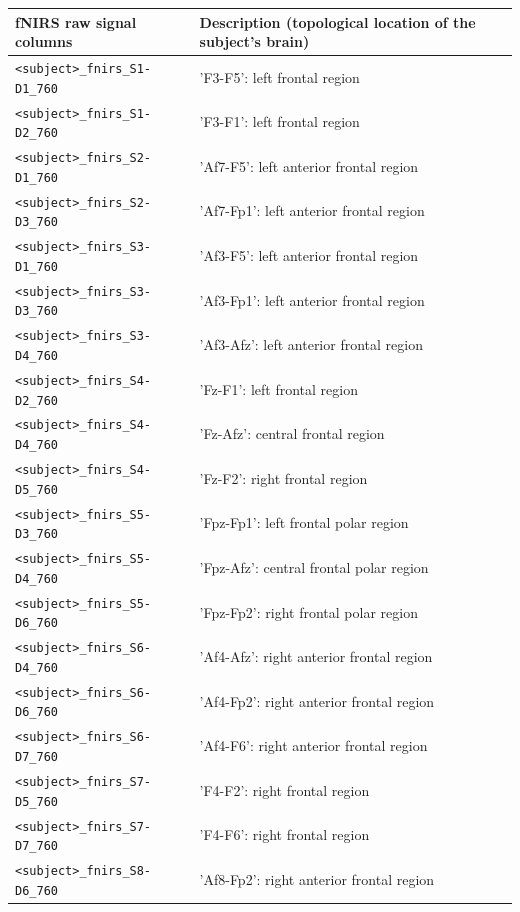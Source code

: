 \begin{table}
  \footnotesize
  \centering
  \begin{tabularx}{\textwidth}{lX}
  \toprule
  fNIRS raw signal columns & Description (topological location of the subject's brain) \\
  \midrule
  \texttt{<subject>\_fnirs\_S1-D1\_760} & 'F3-F5': left frontal region \\
  \texttt{<subject>\_fnirs\_S1-D2\_760} & 'F3-F1': left frontal region  \\
  \texttt{<subject>\_fnirs\_S2-D1\_760} & 'Af7-F5': left anterior frontal region  \\
  \texttt{<subject>\_fnirs\_S2-D3\_760} & 'Af7-Fp1': left anterior frontal region  \\
  \texttt{<subject>\_fnirs\_S3-D1\_760} & 'Af3-F5': left anterior frontal region  \\
  \texttt{<subject>\_fnirs\_S3-D3\_760} & 'Af3-Fp1': left anterior frontal region  \\
  \texttt{<subject>\_fnirs\_S3-D4\_760} & 'Af3-Afz': left anterior frontal region  \\
  \texttt{<subject>\_fnirs\_S4-D2\_760} & 'Fz-F1': left frontal region  \\
  \texttt{<subject>\_fnirs\_S4-D4\_760} & 'Fz-Afz': central frontal region  \\
  \texttt{<subject>\_fnirs\_S4-D5\_760} & 'Fz-F2': right frontal region  \\
  \texttt{<subject>\_fnirs\_S5-D3\_760} & 'Fpz-Fp1': left frontal polar region  \\
  \texttt{<subject>\_fnirs\_S5-D4\_760} & 'Fpz-Afz': central frontal polar region  \\
  \texttt{<subject>\_fnirs\_S5-D6\_760} & 'Fpz-Fp2': right frontal polar region  \\
  \texttt{<subject>\_fnirs\_S6-D4\_760} & 'Af4-Afz': right anterior frontal region  \\
  \texttt{<subject>\_fnirs\_S6-D6\_760} & 'Af4-Fp2': right anterior frontal region  \\
  \texttt{<subject>\_fnirs\_S6-D7\_760} & 'Af4-F6': right anterior frontal region  \\
  \texttt{<subject>\_fnirs\_S7-D5\_760} & 'F4-F2': right frontal region  \\
  \texttt{<subject>\_fnirs\_S7-D7\_760} & 'F4-F6': right frontal region  \\
  \texttt{<subject>\_fnirs\_S8-D6\_760} & 'Af8-Fp2': right anterior frontal region  \\

\end{tabularx}
\end{table}
